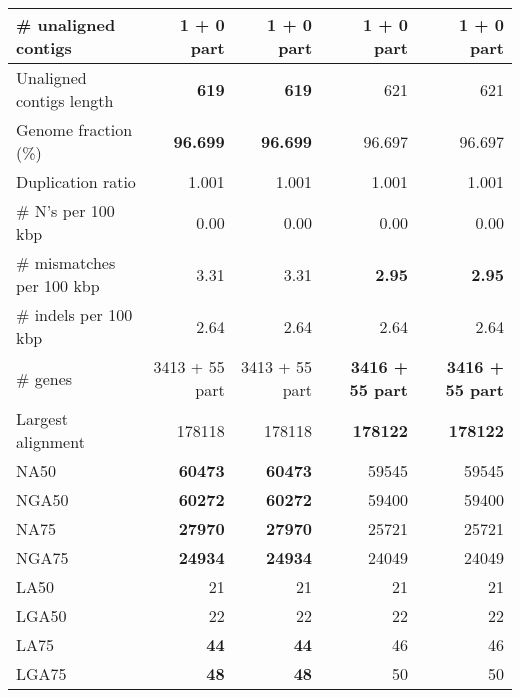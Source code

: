 \documentclass[12pt,a4paper]{article}
\begin{document}
\begin{table}[ht]
\begin{center}
\begin{tabular}{|l*{4}{|r}|}
\# unaligned contigs & 1 + 0 part & 1 + 0 part & 1 + 0 part & 1 + 0 part \\ \hline
Unaligned contigs length & {\bf 619} & {\bf 619} & 621 & 621 \\ \hline
Genome fraction (\%) & {\bf 96.699} & {\bf 96.699} & 96.697 & 96.697 \\ \hline
Duplication ratio & 1.001 & 1.001 & 1.001 & 1.001 \\ \hline
\# N's per 100 kbp & 0.00 & 0.00 & 0.00 & 0.00 \\ \hline
\# mismatches per 100 kbp & 3.31 & 3.31 & {\bf 2.95} & {\bf 2.95} \\ \hline
\# indels per 100 kbp & 2.64 & 2.64 & 2.64 & 2.64 \\ \hline
\# genes & 3413 + 55 part & 3413 + 55 part & {\bf 3416 + 55 part} & {\bf 3416 + 55 part} \\ \hline
Largest alignment & 178118 & 178118 & {\bf 178122} & {\bf 178122} \\ \hline
NA50 & {\bf 60473} & {\bf 60473} & 59545 & 59545 \\ \hline
NGA50 & {\bf 60272} & {\bf 60272} & 59400 & 59400 \\ \hline
NA75 & {\bf 27970} & {\bf 27970} & 25721 & 25721 \\ \hline
NGA75 & {\bf 24934} & {\bf 24934} & 24049 & 24049 \\ \hline
LA50 & 21 & 21 & 21 & 21 \\ \hline
LGA50 & 22 & 22 & 22 & 22 \\ \hline
LA75 & {\bf 44} & {\bf 44} & 46 & 46 \\ \hline
LGA75 & {\bf 48} & {\bf 48} & 50 & 50 \\ \hline
\end{tabular}
\end{center}
\end{table}
\end{document}
